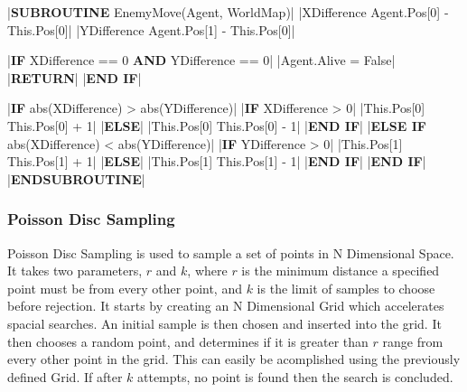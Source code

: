\begin{flushleft}
                \vspace{0.2cm}
                \begin{pseudocode}
|\textbf{SUBROUTINE} EnemyMove(Agent, WorldMap)|
    |XDifference \leftarrow Agent.Pos[0] - This.Pos[0]|
    |YDifference \leftarrow Agent.Pos[1] - This.Pos[0]|

    |\textbf{IF} XDifference == 0 \textbf{AND} YDifference == 0|
        |Agent.Alive = False|
        |\textbf{RETURN}|
    |\textbf{END IF}|

    |\textbf{IF} abs(XDifference) > abs(YDifference)|
        |\textbf{IF} XDifference > 0|
            |This.Pos[0] \leftarrow This.Pos[0] + 1|
        |\textbf{ELSE}|
            |This.Pos[0] \leftarrow This.Pos[0] - 1|
        |\textbf{END IF}|
    |\textbf{ELSE IF} abs(XDifference) < abs(YDifference)|
        |\textbf{IF} YDifference > 0|
            |This.Pos[1] \leftarrow This.Pos[1] + 1|
        |\textbf{ELSE}|
            |This.Pos[1] \leftarrow This.Pos[1] - 1|
        |\textbf{END IF}|
    |\textbf{END IF}|
|\textbf{ENDSUBROUTINE}|
                \end{pseudocode}
                
                \vspace{0.5cm}
            \subsubsection{Poisson Disc Sampling}
                Poisson Disc Sampling is used to sample a set of points in N Dimensional Space. It takes two parameters, $r$ and $k$, where
                $r$ is the minimum distance a specified point must be from every other point, and $k$ is the limit of samples to choose
                before rejection. It starts by creating an N Dimensional Grid which accelerates spacial searches. An initial sample is then
                chosen and inserted into the grid. It then chooses a random point, and determines if it is greater than $r$ range from every 
                other point in the grid. This can easily be acomplished using the previously defined Grid. If after $k$ attempts, no point is
                found then the search is concluded.


\end{flushleft}
